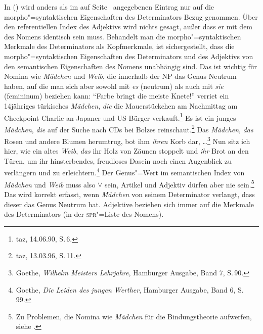 \noindent
In () wird anders als im auf Seite~\pageref{le-kleinen-sem}
angegebenen Eintrag nur auf die morpho"=syntaktischen Eigenschaften des Determinators Bezug genommen.
Über den referentiellen Index des Adjektivs wird nichts gesagt, außer dass er mit dem des Nomens
identisch sein muss. Behandelt man die morpho"=syntaktischen Merkmale des Determinators als
Kopfmerkmale, ist sichergestellt, dass die morpho"=syntaktischen Eigenschaften
des Determinators und des Adjektivs von den semantischen Eigenschaften des Nomens unabhängig sind.
Das ist wichtig für Nomina wie \emph{Mädchen} und \emph{Weib}, die innerhalb der NP das Genus Neutrum
haben, auf die man sich aber sowohl mit \emph{es} (neutrum) als auch mit \emph{sie} (femininum) beziehen kann:
\eal
\ex "`Farbe bringt die meiste Knete!"' verriet ein 14jähriges türkisches {\em Mädchen\/}, {\em die\/} die Mauerstückchen am
      Nachmittag am Checkpoint Charlie an Japaner und US-Bürger verkauft.\footnote{
        taz, 14.06.90, S.\,6.
      }
\ex Es ist ein junges {\em Mädchen\/}, {\em die\/} auf der Suche nach CDs bei Bolzes reinschaut.\footnote{
        taz, 13.03.96, S.\,11.
      }
\zl
\eal
\label{bsp-neu-neu-goethe}
\ex Das {\em Mädchen\/}, {\em das\/} Rosen und andere Blumen herumtrug, bot ihm \emph{ihren} Korb
dar, \ldots\footnote{
        Goethe, {\em Wilhelm Meisters Lehrjahre\/}, Hamburger Ausgabe, Band 7, S.\,90.
      }
\ex Nun sitz ich hier, wie ein altes {\em Weib\/}, {\em das\/} ihr Holz von Zäunen stoppelt
      und \emph{ihr} Brot an den Türen, um ihr hinsterbendes, freudloses Dasein noch einen
      Augenblick zu verlängern und zu erleichtern.\footnote{
        Goethe, {\em Die Leiden des jungen Werther\/}, Hamburger Ausgabe, Band 6, S.\,99.
      }\label{bsp-goethe-altes-weib}
\zl
Der Genus"=Wert im semantischen Index von \emph{Mädchen} und \emph{Weib} muss also  $\vee$  sein, Artikel
und Adjektiv dürfen aber nie  sein.\footnote{
  Zu Problemen, die Nomina wie \emph{Mädchen} für die Bindungstheorie aufwerfen,
  siehe .%
}
Das wird korrekt erfasst, wenn \emph{Mädchen} von seinem Determinator verlangt,
dass dieser das Genus Neutrum hat. Adjektive beziehen sich immer auf die Merkmale des Determinators (in der \textsc{spr}"=Liste
des Nomens).

